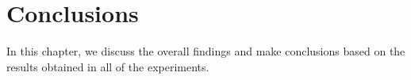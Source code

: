 \cleardoublepage

\chapter{Conclusions}
\label{colcusionschapter}

In this chapter, we discuss the overall findings and make conclusions based on the results obtained in all of the experiments.






